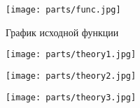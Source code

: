 \documentclass[../body.tex]{subfiles}
\begin{document}
\begin{figure}[H]
    \centering
    \texttt{[image: parts/func.jpg]}
    \caption{График исходной функции}
\end{figure}

\begin{figure}[H]
    \centering
    \texttt{[image: parts/theory1.jpg]}
\end{figure}

\begin{figure}[H]
    \centering
    \texttt{[image: parts/theory2.jpg]}
\end{figure}

\begin{figure}[H]
    \centering
    \texttt{[image: parts/theory3.jpg]}
\end{figure}
\end{document}
